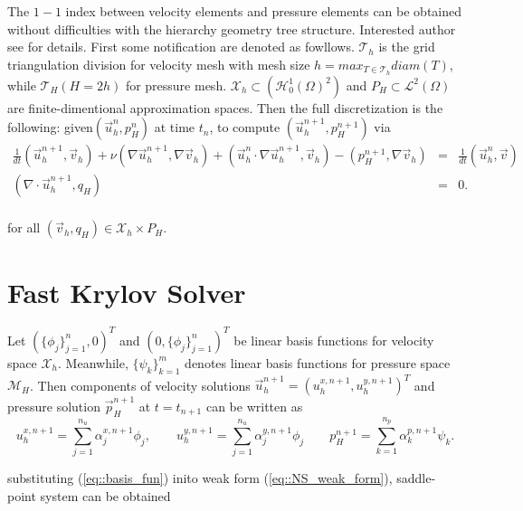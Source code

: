 \documentclass{eajam}
\begin{document}
   The $1-1$ index between velocity elements and pressure elements can
   be obtained without difficulties with the hierarchy geometry tree
   structure. Interested author see \cite{Wu2016moving} for
   details. First some notification are denoted as
   fowllows. $\mathcal{T}_h$ is the grid triangulation
   division for velocity mesh with mesh size $h = max_{T \in
     \mathcal{T}_h} diam(T)$, while $\mathcal{T}_{H}(H = 2h)$ for
   pressure mesh. $\mathcal{X}_h \subset (\mathcal{H}_0^1(\Omega)^2)$ and
   $P_H \subset \mathcal{L}^2(\Omega)$ are finite-dimentional
   approximation spaces. Then the full discretization is the
   following: given$(\vec{u}_h^n, p_H^n)$ at time $t_n$, to compute
   $(\vec{u}_h^{n + 1}, p_H^{n + 1})$ via 
   \begin{equation}
     \begin{aligned}
       \frac{1}{dt}(\vec{u}_h^{n + 1}, \vec{v}_h) + \nu (\nabla
       \vec{u}_h^{n + 1}, \nabla \vec{v}_h) + (\vec{u}_h^n \cdot
       \nabla \vec{u}_h^{n + 1}, \vec{v}_h) - (p_H^{n + 1}, \nabla
       \vec{v}_h) & = &\frac{1}{dt}(\vec{u}_h^n, \vec{v}) \\
       (\nabla \cdot \vec{u}_h^{n + 1}, q_H) & = & 0. \\
     \end{aligned}
     \label{eq::NS_weak_form}
   \end{equation}
   
   for all $(\vec{v}_h, q_H) \in \mathcal{X}_h \times P_H$.

\section{Fast Krylov Solver}
  \label{sec3} Let $\left(\{\phi_j \}_{j = 1}^n, 0 \right)^T$ and
  $\left(0, \{\phi_j\}_{j = 1}^n\right)^T$ be linear basis functions
  for velocity space $\mathcal{X}_h$. Meanwhile, $\{\psi_k\}_{k =
    1}^m$ denotes linear basis functions for pressure space
  $\mathcal{M}_H$. Then components of velocity solutions
  $\vec{u}_h^{n + 1} = (u_h^{x, n + 1}, u_h^{y, n + 1})^T$ and pressure
  solution $\vec{p}_H^{n + 1}$ at $t = t_{n + 1}$ can be written as 
  \begin{equation}
    u_h^{x, n + 1} = \sum_{j = 1}^{n_u} \alpha_j^{x, n + 1} \phi_j,
    \qquad u_h^{y, n + 1} = \sum_{j = 1}^{n_u} \alpha_j^{y, n + 1}
    \phi_j \qquad p_H^{n + 1} = \sum_{k = 1}^{n_p}\alpha_k^{p, n + 1}
    \psi_k.
    \label{eq::basis_fun}
  \end{equation}
  
  substituting (\ref{eq::basis_fun}) inito weak form
  (\ref{eq::NS_weak_form}), saddle-point system can be obtained
  
\end{document}
